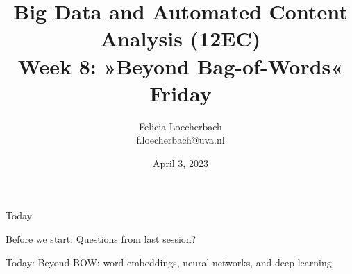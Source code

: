 \documentclass[compress]{beamer}
\begin{document}
\title[Big Data and Automated Content Analysis]{\textbf{Big Data and Automated Content Analysis (12EC)} 
\\Week 8: »Beyond Bag-of-Words«
\\Friday}
\author[Felicia Loecherbach]{Felicia Loecherbach\\ \footnotesize{f.loecherbach@uva.nl \\}}
\date{April 3, 2023}


\begin{frame}{}
	\titlepage
\end{frame}

\begin{frame}{Today}
	\tableofcontents
\end{frame}
\begin{frame}[standout]
Before we start: Questions from last session?
\end{frame}


\begin{frame}[standout]
Today: Beyond BOW: word embeddings, neural networks, and deep learning
\end{frame}









\begin{frame}
\printbibliography
\end{frame}
\end{document}
